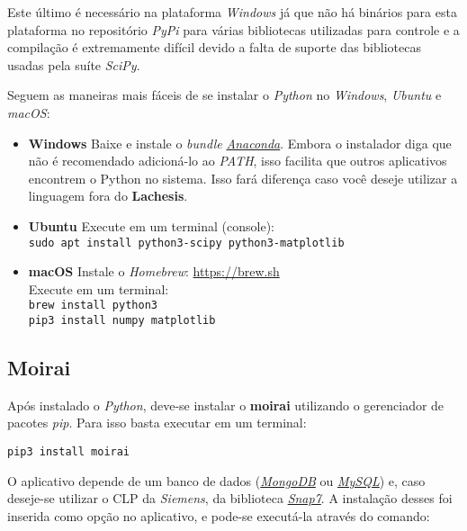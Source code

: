 Este último é necessário na plataforma \textit{Windows} já que não há binários
para esta plataforma no repositório \textit{PyPi} para várias bibliotecas
utilizadas para controle e a compilação é extremamente difícil devido a falta de
suporte das bibliotecas usadas pela suíte \textit{SciPy}.

Seguem as maneiras mais fáceis de se instalar o \textit{Python} no
\textit{Windows}, \textit{Ubuntu} e \textit{macOS}\@:

\begin{itemize}
\item \textbf{Windows}
        Baixe e instale o \textit{bundle}
        \href{https://www.continuum.io/downloads}{\textit{Anaconda}}. Embora o
        instalador diga que não é recomendado adicioná-lo ao \textit{PATH}, isso
        facilita que outros aplicativos encontrem o Python no sistema. Isso fará
        diferença caso você deseje utilizar a linguagem fora do
        \textbf{Lachesis}.

\item \textbf{Ubuntu}
        Execute em um terminal (console):\\
        \texttt{sudo apt install python3-scipy python3-matplotlib}

\item \textbf{macOS}
        Instale o \textit{Homebrew}: \url{https://brew.sh}\\
        Execute em um terminal:\\
        \texttt{brew install python3}\\
        \texttt{pip3 install numpy matplotlib}
\end{itemize}

\subsection{Moirai}%
\label{subsec:install-moirai}

Após instalado o \textit{Python}, deve-se instalar o \textbf{moirai} utilizando
o gerenciador de pacotes \textit{pip}. Para isso basta executar em um terminal:

\texttt{pip3 install moirai}

O aplicativo depende de um banco de dados
(\href{https://www.mongodb.com/}{\textit{MongoDB}} ou
\href{https://www.mysql.com/}{\textit{MySQL}}) e, caso deseje-se utilizar o CLP
da \textit{Siemens}, da biblioteca
\href{http://snap7.sourceforge.net/}{\textit{Snap7}}. A instalação desses foi
inserida como opção no aplicativo, e pode-se executá-la através do comando:

